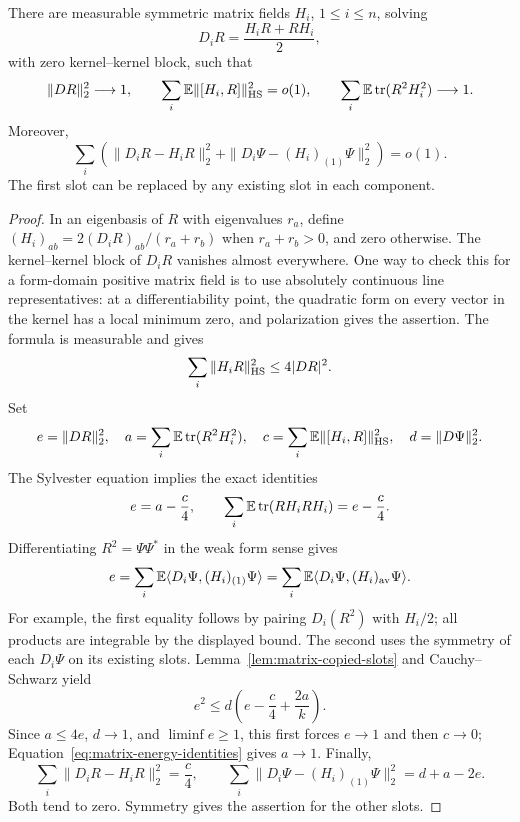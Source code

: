 \begin{lemma}\label{lem:matrix-saturation}
There are measurable symmetric matrix fields $H_i$, $1\le i\le n$, solving
\begin{equation}\label{eq:matrix-sylvester}
 D_iR=\frac{H_iR+RH_i}{2},
\end{equation}
with zero kernel--kernel block, such that
\begin{equation}\label{eq:matrix-saturation}
 \|DR\|_2^2\longrightarrow1,\qquad
 \sum_i\mathbb E\|[H_i,R]\|_{\mathrm{HS}}^2=o(1),\qquad
 \sum_i\mathbb E\operatorname{tr}(R^2H_i^2)\longrightarrow1.
\end{equation}
Moreover,
\begin{equation}\label{eq:matrix-action-errors}
 \sum_i\left(\|D_iR-H_iR\|_2^2+
 \|D_i\Psi-(H_i)_{(1)}\Psi\|_2^2\right)=o(1).
\end{equation}
The first slot can be replaced by any existing slot in each component.
\end{lemma}
\begin{proof}
In an eigenbasis of $R$ with eigenvalues $r_a$, define
$(H_i)_{ab}=2(D_iR)_{ab}/(r_a+r_b)$ when $r_a+r_b>0$, and zero otherwise.
The kernel--kernel block of $D_iR$ vanishes almost everywhere.  One way to
check this for a form-domain positive matrix field is to use absolutely
continuous line representatives: at a differentiability point, the
quadratic form on every vector in the kernel has a local minimum zero,
and polarization gives the assertion.  The formula is measurable and gives
\[
 \sum_i\|H_iR\|_{\mathrm{HS}}^2\le4|DR|^2.
\]
Set
\[
 e=\|DR\|_2^2,\quad a=\sum_i\mathbb E\operatorname{tr}(R^2H_i^2),\quad
 c=\sum_i\mathbb E\|[H_i,R]\|_{\mathrm{HS}}^2,\quad d=\|D\Psi\|_2^2.
\]
The Sylvester equation implies the exact identities
\begin{equation}\label{eq:matrix-energy-identities}
 e=a-\frac c4,\qquad
 \sum_i\mathbb E\operatorname{tr}(RH_iRH_i)=e-\frac c4.
\end{equation}
Differentiating $R^2=\Psi\Psi^*$ in the weak form sense gives
\[
 e=\sum_i\mathbb E\langle D_i\Psi,(H_i)_{(1)}\Psi\rangle
   =\sum_i\mathbb E\langle D_i\Psi,(H_i)_{\mathrm{av}}\Psi\rangle.
\]
For example, the first equality follows by pairing $D_i(R^2)$ with $H_i/2$;
all products are integrable by the displayed bound.  The second uses the
symmetry of each $D_i\Psi$ on its existing slots.
Lemma~\ref{lem:matrix-copied-slots} and Cauchy--Schwarz yield
\[
 e^2\le d\left(e-\frac c4+\frac{2a}{k}\right).
\]
Since $a\le4e$, $d\to1$, and $\liminf e\ge1$, this first forces $e\to1$
and then $c\to0$; Equation~\eqref{eq:matrix-energy-identities} gives $a\to1$.
Finally,
\[
 \sum_i\|D_iR-H_iR\|_2^2=\frac c4,
 \qquad
 \sum_i\|D_i\Psi-(H_i)_{(1)}\Psi\|_2^2=d+a-2e.
\]
Both tend to zero.  Symmetry gives the assertion for the other slots.
\end{proof}

